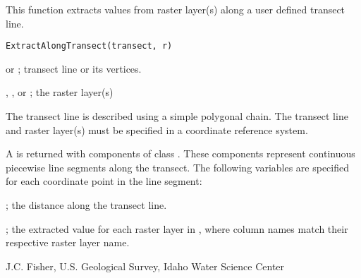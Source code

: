 \documentclass[a4paper]{book}
\begin{document}
%
\begin{Description}\relax
This function extracts values from raster layer(s) along a user defined transect line.
\end{Description}
%
\begin{Usage}
\begin{verbatim}
ExtractAlongTransect(transect, r)
\end{verbatim}
\end{Usage}
%
\begin{Arguments}
\begin{ldescription}
\item[\code{transect}]  or ; transect line or its vertices.
\item[\code{r}] , , or ; the raster layer(s)
\end{ldescription}
\end{Arguments}
%
\begin{Details}\relax
The transect line is described using a simple polygonal chain.
The transect line and raster layer(s) must be specified in a coordinate reference system.
\end{Details}
%
\begin{Value}
A  is returned with components of class .
These components represent continuous piecewise line segments along the transect.
The following variables are specified for each coordinate point in the line segment:
\begin{ldescription}
\item[\code{dist}] ; the distance along the transect line.
\item[\code{2, ..., n}] ; the extracted value for each raster layer in , where column names match their respective raster layer name.
\end{ldescription}
\end{Value}
%
\begin{Author}\relax
J.C. Fisher, U.S. Geological Survey, Idaho Water Science Center
\end{Author}
%
\begin{SeeAlso}\relax
{}
\end{SeeAlso}
%
\end{document}
